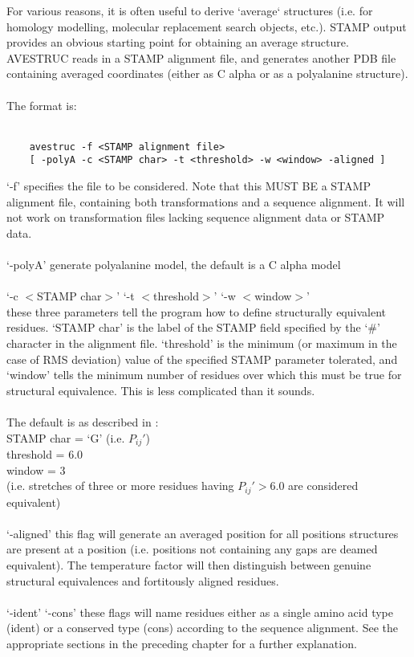     For various reasons, it is often useful to derive `average`
    structures (i.e. for homology modelling, molecular replacement
    search objects, etc.).  STAMP output provides an obvious starting
    point for obtaining an average structure.  AVESTRUC reads in a
    STAMP alignment file, and generates another PDB file containing
    averaged coordinates (either as C alpha or as a polyalanine 
    structure).\\
    \\
    The format is:\\
    \\
    \begin{scriptsize}\begin{verbatim}
    avestruc -f <STAMP alignment file> 
    [ -polyA -c <STAMP char> -t <threshold> -w <window> -aligned ]
    \end{verbatim} \end{scriptsize}

    `-f' specifies the file to be considered.  Note that this MUST BE 
    a STAMP alignment file, containing both transformations and a
    sequence alignment.  It will not work on transformation files
    lacking sequence alignment data or STAMP data.\\
    \\
    `-polyA' generate  polyalanine model, the default is a C alpha
    model\\
    \\
    `-c $<$STAMP char$>$' `-t $<$threshold$>$' `-w $<$window$>$'\\
    these three parameters tell the program how to define structurally
    equivalent residues.  `STAMP char' is the label of the STAMP field
    specified by the `\#' character  in the alignment file.
    `threshold' is the minimum (or maximum in the case of RMS deviation)
    value of the specified STAMP parameter tolerated, and `window' tells
    the minimum number of residues over which this must be true for 
    structural equivalence.  This is less complicated than it sounds.\\
    \\
    The default is as described in \cite{rb92b}:\\  
    STAMP char = `G' (i.e. $P_{ij}{\prime}$)\\
    threshold  = 6.0\\
    window     = 3 \\
    (i.e. stretches of three or more residues having $P_{ij}{\prime} > 6.0$
    are considered equivalent)\\
    \\
    `-aligned' this flag will generate an averaged position for all positions
    structures are present at a position (i.e. positions not containing any 
    gaps are deamed equivalent).   The temperature factor will then distinguish
    between genuine structural equivalences and fortitously aligned residues.\\
    \\
    `-ident' `-cons'  these flags will name residues either as a single amino acid
    type (ident) or a conserved type (cons) according to the sequence alignment.
    See the appropriate sections in the preceding chapter for a further explanation.


